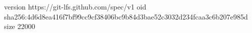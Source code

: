 version https://git-lfs.github.com/spec/v1
oid sha256:4d6d8ea416f7bf99cc9cf38406bc9b84d3bae52c3032d234fcaa3c6b207e985d
size 22000
